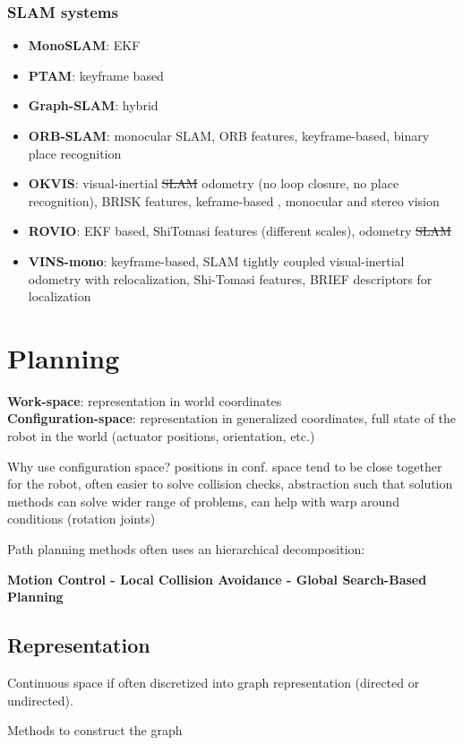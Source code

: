 \documentclass[fontsize=6pt]{scrartcl}
\begin{document}
\begin{multicols*}{4}
\subsubsection*{SLAM systems}
\begin{itemize}
\item \textbf{MonoSLAM}: EKF
\item \textbf{PTAM}: keyframe based
\item \textbf{Graph-SLAM}: hybrid
\item \textbf{ORB-SLAM}: monocular SLAM, ORB features, keyframe-based, binary place recognition
\item \textbf{OKVIS}: visual-inertial \st{SLAM} odometry (no loop closure, no place recognition), BRISK features, keframe-based , monocular and stereo vision
\item \textbf{ROVIO}: EKF based, ShiTomasi features (different scales), odometry \st{SLAM}
\item \textbf{VINS-mono}: keyframe-based, SLAM tightly coupled visual-inertial odometry with relocalization, Shi-Tomasi features, BRIEF descriptors for localization	
\end{itemize}

\section*{Planning}
\textbf{Work-space}: representation in world coordinates\\
\textbf{Configuration-space}: representation in generalized coordinates, full state of the robot in the world (actuator positions, orientation, etc.)

Why use configuration space? positions in conf. space tend to be close together for the robot, often easier to solve collision checks, abstraction such that solution methods can solve wider range of problems, can help with warp around conditions (rotation joints)

Path planning methods often uses an hierarchical decomposition:

\textbf{Motion Control - Local Collision Avoidance - Global Search-Based Planning}

\subsection*{Representation}

Continuous space if often discretized into graph representation (directed or undirected).

Methods to construct the graph


\end{multicols*}
\end{document}

